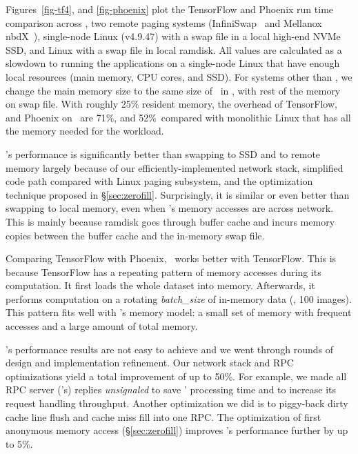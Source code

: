 \documentclass[10pt,times,twocolumn]{z2-article}
\begin{document}
{{{{{{{
Figures~\ref{fig-tf4}, and \ref{fig-phoenix} plot the TensorFlow and Phoenix run time comparison across 
\lego, two remote paging systems (InfiniSwap~\cite{GU17-NSDI} and Mellanox nbdX~\cite{nbdX}), 
single-node Linux (v4.9.47) with a swap file in a local high-end NVMe SSD, and Linux with a swap file in local ramdisk.
All values are calculated as a slowdown to running the applications on a single-node Linux that have enough local resources (main memory, CPU cores, and SSD).
For systems other than \lego, we change the main memory size to the same size of \excache\ in \lego, with rest of the memory on swap file. 
With roughly 25\% resident memory, the overhead of TensorFlow, and Phoenix on \lego\ are 
71\%, and 52\%\ compared with monolithic Linux that has all the memory needed for the workload.

\lego's performance is significantly better than swapping to SSD and to remote memory 
largely because of our efficiently-implemented network stack, simplified code path compared with Linux paging subsystem,
and the optimization technique proposed in \S\ref{sec:zerofill}.
Surprisingly, it is similar or even better than swapping to local memory, even when \lego's memory accesses are across network.
This is mainly because ramdisk goes through buffer cache and incurs memory copies between the buffer cache and the in-memory swap file.

Comparing TensorFlow with Phoenix, \lego\ works better with TensorFlow.
This is because TensorFlow has a repeating pattern of memory accesses during its computation.
It first loads the whole dataset into memory. 
Afterwards, it performs computation on a rotating {\em batch\_size} of in-memory data (\eg, 100 images).
This pattern fits well with \lego's memory model: a small set of memory with frequent accesses and a large amount of total memory.
\fi

\lego's performance results are not easy to achieve and we went through rounds of design and implementation refinement.
Our network stack and RPC optimizations yield a total improvement of up to 50\%.
For example, we made all RPC server (\mcomponent's) replies {\em unsignaled} to save \mcomponent' processing time
and to increase its request handling throughput.
Another optimization we did is to piggy-back dirty cache line flush and cache miss fill into one RPC.
The optimization of first anonymous memory access (\S\ref{sec:zerofill}) improves \lego's performance further by up to 5\%.

}}}}}}}
\end{document}
